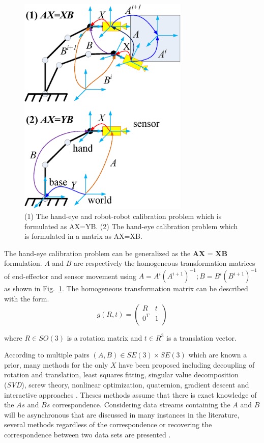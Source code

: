 \documentclass[letterpaper, 10 pt, conference]{ieeeconf}  %
\begin{document}
\begin{center}
\begin{figure}[htbp]
\centering
\includegraphics[width=3.2in]{fig1.eps}
\caption{
(1) The hand-eye and robot-robot calibration problem which is formulated as AX=YB. (2) The hand-eye calibration problem which is formulated in a matrix as AX=XB.
}
\label{fig1}
\end{figure}
\end{center}

The hand-eye calibration problem can be generalized as the $\textbf{AX = XB}$ formulation. $A$ and $B$ are respectively the homogeneous transformation matrices of end-effector and sensor movement using $A = A^{i}(A^{i+1})^{-1}; B = B^{i}(B^{i+1})^{-1}$ as shown in Fig.~\ref{fig1}. The homogeneous transformation matrix can be described with the form.
\begin{equation}\label{equ0}
    g(R,t)=\left(
             \begin{array}{cc}
               R & t \\
               0^{T} & 1 \\
             \end{array}
           \right)
\end{equation}

where $R \in SO(3)$ is a rotation matrix and $t \in R^{3}$ is a translation vector.

According to multiple pairs $(A,B) \in SE(3) \times SE(3)$ which are known a prior, many methods for the only $X$ have been proposed including decoupling of rotation and translation, least squares fitting, singular value decomposition (\emph{SVD}), screw theory, nonlinear
optimization, quaternion, gradient descent and interactive approaches \cite{Shiu1989,Tsai1989,Wang1992,Park1994,Horaud1995,Daniilidis1999,Fassi2005,Zhao2011,Ackerman2014a}. Theses methods assume that there is exact knowledge of the $As$ and $Bs$ correspondence. Considering data streams containing the $A$ and $B$ will be asynchronous that are discussed in many instances
in the literature, several methods regardless of the correspondence or recovering the correspondence between two data sets are presented \cite{Ackerman2013a,Ackerman2013,Ackerman2014}.
\end{document}
